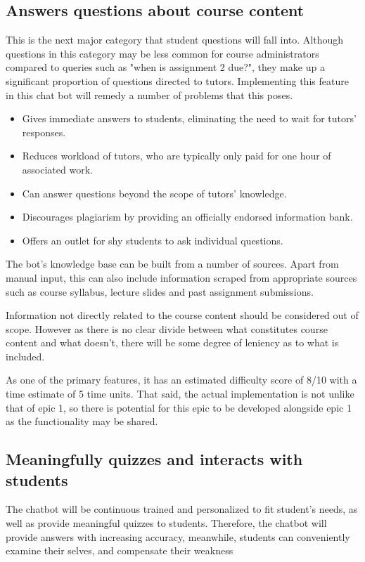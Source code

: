 \documentclass{article}
\begin{document}
\subsection{Answers questions about course content}
This is the next major category that student questions will fall into. Although questions in this category may be less common for course administrators compared to queries such as "when is assignment 2 due?", they make up a significant proportion of questions directed to tutors. Implementing this feature in this chat bot will remedy a number of problems that this poses.

\begin{itemize}
  \item Gives immediate answers to students, eliminating the need to wait for tutors' responses.
  \item Reduces workload of tutors, who are typically only paid for one hour of associated work.
  \item Can answer questions beyond the scope of tutors' knowledge.
  \item Discourages plagiarism by providing an officially endorsed information bank.
  \item Offers an outlet for shy students to ask individual questions.
\end{itemize}

The bot's knowledge base can be built from a number of sources. Apart from manual input, this can also include information scraped from appropriate sources such as course syllabus, lecture slides and past assignment submissions.

Information not directly related to the course content should be considered out of scope. However as there is no clear divide between what constitutes course content and what doesn't, there will be some degree of leniency as to what is included.

As one of the primary features, it has an estimated difficulty score of 8/10 with a time estimate of 5 time units. That said, the actual implementation is not unlike that of epic 1, so there is potential for this epic to be developed alongside epic 1 as the functionality may be shared.


\subsection{Meaningfully quizzes and interacts with students}
The chatbot will be continuous trained and personalized to fit student’s needs, as well as provide meaningful quizzes to students. Therefore, the chatbot will provide answers with increasing accuracy, meanwhile, students can conveniently examine their selves, and compensate their weakness
\end{document}

